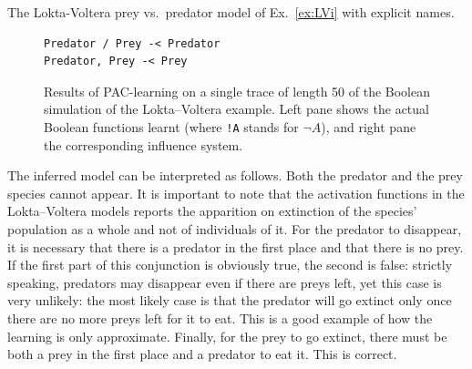 \documentclass{llncs}
\begin{document}
\begin{listfig}[htp]
	
   \caption{The Lokta-Voltera prey vs.\ predator model of Ex.~\ref{ex:LVi}
   with explicit names.\label{bool-LV}}
\end{listfig}%
\begin{figure}[htp]
   \begin{minipage}{.5\textwidth}
      
   \end{minipage}%
   \vrule\hspace{.04\textwidth}
   \begin{minipage}{.45\textwidth}
      \begin{lstlisting}
Predator / Prey -< Predator
Predator, Prey -< Prey
      \end{lstlisting}
   \end{minipage}
   \caption{Results of PAC-learning on a single trace of length 50 of the Boolean simulation of the
   Lokta--Voltera example. Left pane shows the actual Boolean functions
learnt (where \texttt{!A} stands for $\neg A$), and right pane the corresponding influence system.}\label{bool-LV.res}
\end{figure}

The inferred model can be interpreted as follows.
%
Both the predator and the prey species cannot appear. It is important to note that the activation functions in the Lokta--Voltera models reports the apparition on extinction of the species' population as a whole and not of individuals of it.
%
For the predator to disappear, it is necessary that there is a predator in the first place and that there is no prey. If the first part of this conjunction is obviously true, the second is false: strictly speaking, predators may disappear even if there are preys left, yet this case is very unlikely: the most likely case is that the predator will go extinct only once there are no more preys left for it to eat. This is a good example of how the learning is only approximate.
%
Finally, for the prey to go extinct, there must be both a prey in the first place and a predator to eat it. This is correct.

\end{document}
